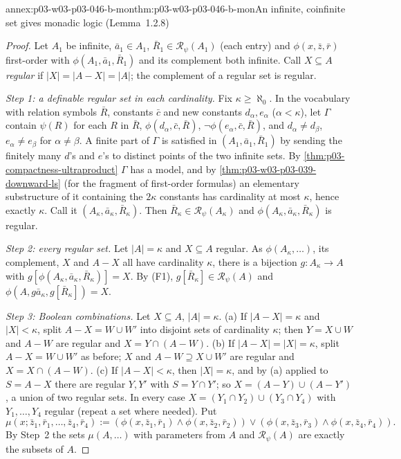 \begin{annexitem}{annex:p03-w03-p03-046-b-mon}{thm:p03-w03-p03-046-b-mon}{An infinite, coinfinite set gives monadic logic (Lemma~1.2.8)}
\begin{proof}
Let \(A_1\) be infinite, \(\bar a_1\in A_1\), \(\bar R_1\in\mathscr
R_\psi(A_1)\) (each entry) and \(\phi(x,\bar z,\bar r)\) first-order with
\(\phi(A_1,\bar a_1,\bar R_1)\) and its complement both infinite. Call
\(X\subseteq A\) \emph{regular} if \(|X|=|A-X|=|A|\); the complement of a
regular set is regular.

\emph{Step 1: a definable regular set in each cardinality.} Fix
\(\kappa\ge\aleph_0\). In the vocabulary with relation symbols \(\bar R\),
constants \(\bar c\) and new constants \(d_\alpha,e_\alpha\)
(\(\alpha<\kappa\)), let \(\Gamma\) contain \(\psi(R)\) for each \(R\) in
\(\bar R\), \(\phi(d_\alpha,\bar c,\bar R)\), \(\neg\phi(e_\alpha,\bar
c,\bar R)\), and \(d_\alpha\neq d_\beta\), \(e_\alpha\neq e_\beta\) for
\(\alpha\neq\beta\). A finite part of \(\Gamma\) is satisfied in
\((A_1,\bar a_1,\bar R_1)\) by sending the finitely many \(d\)'s and \(e\)'s
to distinct points of the two infinite sets. By
\cref{thm:p03-compactness-ultraproduct} \(\Gamma\) has a model, and by
\cref{thm:p03-w03-p03-039-downward-ls} (for the fragment of first-order formulas) an elementary substructure of it containing the
\(2\kappa\) constants has cardinality at most \(\kappa\), hence exactly
\(\kappa\). Call it \((A_\kappa,\bar a_\kappa,\bar R_\kappa)\). Then
\(\bar R_\kappa\in\mathscr R_\psi(A_\kappa)\) and
\(\phi(A_\kappa,\bar a_\kappa,\bar R_\kappa)\) is regular.

\emph{Step 2: every regular set.} Let \(|A|=\kappa\) and \(X\subseteq A\)
regular. As \(\phi(A_\kappa,\dots)\), its complement, \(X\) and \(A-X\)
all have cardinality \(\kappa\), there is a bijection \(g\colon A_\kappa\to
A\) with \(g[\phi(A_\kappa,\bar a_\kappa,\bar R_\kappa)]=X\). By (F1),
\(g[\bar R_\kappa]\in\mathscr R_\psi(A)\) and
\(\phi(A,g\bar a_\kappa,g[\bar R_\kappa])=X\).

\emph{Step 3: Boolean combinations.} Let \(X\subseteq A\), \(|A|=\kappa\).
(a) If \(|A-X|=\kappa\) and \(|X|<\kappa\), split \(A-X=W\cup W'\) into
disjoint sets of cardinality \(\kappa\); then \(Y=X\cup W\) and \(A-W\) are
regular and \(X=Y\cap(A-W)\). (b) If \(|A-X|=|X|=\kappa\), split
\(A-X=W\cup W'\) as before; \(X\) and \(A-W\supseteq X\cup W'\) are
regular and \(X=X\cap(A-W)\). (c) If \(|A-X|<\kappa\), then
\(|X|=\kappa\), and by (a) applied to \(S=A-X\) there are regular
\(Y,Y'\) with \(S=Y\cap Y'\); so \(X=(A-Y)\cup(A-Y')\), a union of two
regular sets. In every case \(X=(Y_1\cap Y_2)\cup(Y_3\cap Y_4)\) with
\(Y_1,\dots,Y_4\) regular (repeat a set where needed). Put
\[
\mu(x;\bar z_1,\bar r_1,\dots,\bar z_4,\bar r_4):=
(\phi(x,\bar z_1,\bar r_1)\wedge\phi(x,\bar z_2,\bar r_2))\vee
(\phi(x,\bar z_3,\bar r_3)\wedge\phi(x,\bar z_4,\bar r_4)).
\]
By Step~2 the sets \(\mu(A,\dots)\) with parameters from \(A\) and
\(\mathscr R_\psi(A)\) are exactly the subsets of \(A\).


\end{proof}
\end{annexitem}
